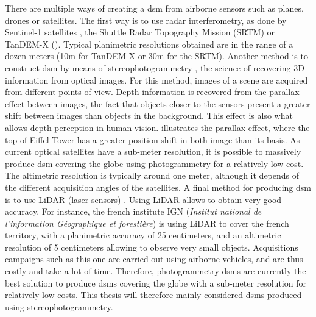 There are multiple ways of creating a \acrshort{dsm} from airborne sensors such as planes, drones or satellites. The first way is to use \acrshort{radar} interferometry, as done by Sentinel-1 satellites \cite{geudtner_sentinel-1_2014}, the Shuttle Radar Topography Mission (SRTM) \cite{farr_shuttle_2007} or TanDEM-X (\cite{krieger_tandem-x_2007}). Typical planimetric resolutions obtained are in the range of a dozen meters (10m for TanDEM-X or 30m for the SRTM). Another method is to construct \acrshort{dsm} by means of stereophotogrammetry \cite{tao_comprehensive_2001}, \ie the science of recovering 3D information from optical images. For this method, images of a scene are acquired from different points of view. Depth information is recovered from the parallax effect between images, \ie the fact that objects closer to the sensors present a greater shift between images than objects in the background. This effect is also what allows depth perception in human vision.  illustrates the parallax effect, where the top of Eiffel Tower has a greater position shift in both image than its basis. As current optical satellites have a sub-meter resolution, it is possible to massively produce \acrshort{dsm} covering the globe using photogrammetry for a relatively low cost. The altimetric resolution is typically around one meter, although it depends of the different acquisition angles of the satellites. A final method for producing \acrshort{dsm} is to use LiDAR (laser sensors) \cite{khosravipour_generating_2016}. Using LiDAR allows to obtain very good accuracy. For instance, the french institute IGN (\textit{Institut national de l'information Géographique et forestière}) is using LiDAR to cover the french territory, with a planimetric accuracy of 25 centimeters, and an altimetric resolution of 5 centimeters allowing to observe very small objects. Acquisitions campaigns such as this one are carried out using airborne vehicles, and are thus costly and take a lot of time. Therefore, photogrammetry \acrshort{dsm}s are currently the best solution to produce \acrshort{dsm}s covering the globe  with a sub-meter resolution for relatively low costs. This thesis will therefore mainly considered \acrshort{dsm}s produced using stereophotogrammetry.

